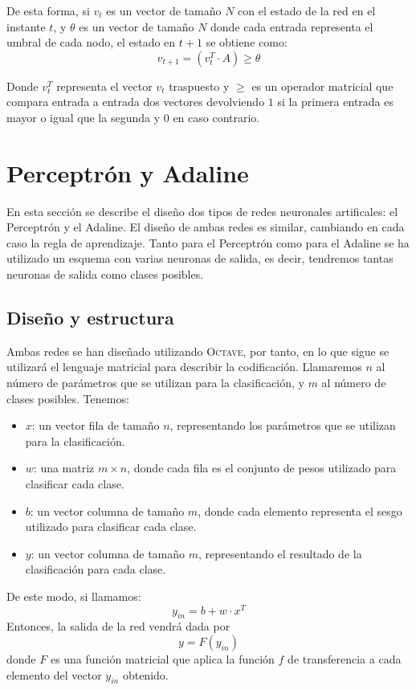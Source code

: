 \documentclass[spanish]{assignment}
\begin{document}
	De esta forma, si $v_t$ es un vector de tamaño $N$ con el estado de la red en el instante $t$, y $\theta$ es un vector de tamaño $N$ donde cada entrada representa el umbral de cada nodo, el estado en $t+1$ se obtiene como:
	$$v_{t+1} = \left(v_t^T\cdot A\right) \ge \theta$$
	
	Donde $v_t^T$ representa el vector $v_t$ traspuesto y $\ge$ es un operador matricial que compara entrada a entrada dos vectores devolviendo $1$ si la primera entrada es mayor o igual que la segunda y $0$ en caso contrario.
	
	\newpage
	\section{Perceptrón y Adaline}
	En esta sección se describe el diseño dos tipos de redes neuronales artificales: el Perceptrón y el Adaline. El diseño de ambas redes es similar, cambiando en cada caso la regla de aprendizaje. Tanto para el Perceptrón como para el Adaline se ha utilizado un esquema con varias neuronas de salida, es decir, tendremos tantas neuronas de salida como clases posibles.
	
	\subsection{Diseño y estructura}
	Ambas redes se han diseñado utilizando \textsc{Octave}, por tanto, en lo que sigue se utilizará el lenguaje matricial para describir la codificación.
	Llamaremos $n$ al número de parámetros que se utilizan para la clasificación, y $m$ al número de clases posibles. Tenemos: 
	\begin{itemize}
		\item $x$: un vector fila de tamaño $n$, representando los parámetros que se utilizan para la clasificación.
		\item $w$: una matriz $m\times n$, donde cada fila es el conjunto de pesos utilizado para clasificar cada clase.
		\item $b$: un vector columna de tamaño $m$, donde cada elemento representa el sesgo utilizado para clasificar cada clase.
		\item $y$: un vector columna de tamaño $m$, representando el resultado de la clasificación para cada clase.
	\end{itemize}
	De este modo, si llamamos:
	$$y_{in} = b + w\cdot x^T$$
	Entonces, la salida de la red vendrá dada por
	$$y = F\left(y_{in}\right)$$
	donde $F$ es una función matricial que aplica la función $f$ de transferencia a cada elemento del vector $y_{in}$ obtenido.
	
\end{document}
